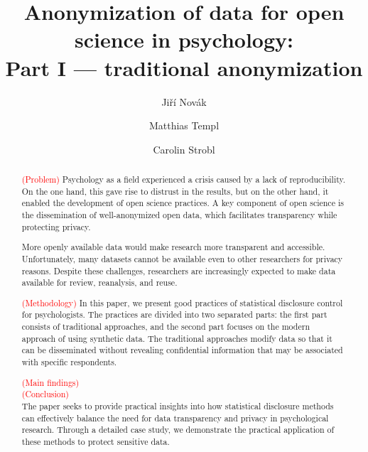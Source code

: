 \documentclass{article}
\title{Anonymization of data for open science in psychology: \\ 
       Part I — traditional anonymization
}
\author{Jiří Novák \and 
        Matthias Templ \and 
        Carolin Strobl
        }
\begin{document}
\maketitle

\begin{abstract}
\textcolor{red}{(Problem)} Psychology as a field experienced a crisis caused by a lack of reproducibility. 
On the one hand, this gave rise to distrust in the results, but on the other hand, it enabled the development of open science practices. 
A key component of open science is the dissemination of well-anonymized open data, which facilitates transparency while protecting privacy.

More openly available data would make research more transparent and accessible. Unfortunately, many datasets cannot be available even to other researchers for privacy reasons. 
Despite these challenges, researchers are increasingly expected to make data available for review, reanalysis, and reuse.

\textcolor{red}{(Methodology)} 
In this paper, we present good practices of statistical disclosure control for psychologists. 
The practices are divided into two separated parts: the first part consists of traditional approaches, and the second part focuses on the modern approach of using synthetic data.
The traditional approaches modify data so that it can be disseminated without revealing confidential information that may be associated with specific respondents. 

\textcolor{red}{(Main findings)} \\ 

\textcolor{red}{(Conclusion)} \\ 
The paper seeks to provide practical insights into how statistical disclosure methods can effectively balance the need for data transparency and privacy in psychological research.
Through a detailed case study, we demonstrate the practical application of these methods to protect sensitive data.

\end{abstract}

\end{document}
